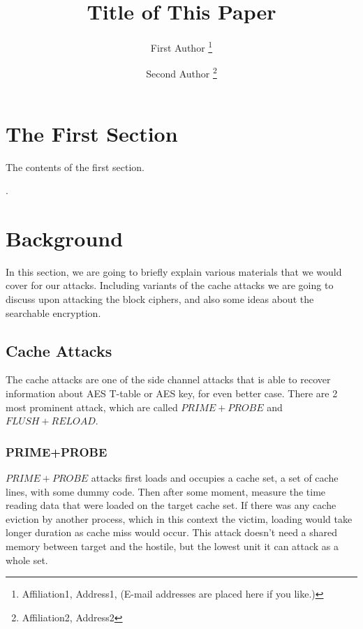 \documentclass[a4paper]{article}
\begin{document}
\title{
  Title of This Paper     %
}
\author{
  First Author           %
  \thanks{
    Affiliation1, Address1,   %
    (E-mail addresses are placed here if you like.)
  }
  \and
  Second Author          %
  \thanks{ %
    Affiliation2, Address2  %
  }
}

\maketitle

\section{The First Section}

The contents of the first section.

\newpage
.
\newpage
\section{Background}
In this section, we are going to briefly explain various materials that we would cover for our attacks. Including variants of the cache attacks we are going to discuss upon attacking the block ciphers, and also some ideas about the searchable encryption.

\subsection{Cache Attacks}

The cache attacks are one of the side channel attacks that is able to recover information about AES T-table or AES key, for even better case. There are 2 most prominent attack, which are called $PRIME+PROBE$ and $FLUSH+RELOAD$.

\subsubsection{PRIME+PROBE}

$PRIME+PROBE$ attacks first loads and occupies a cache set, a set of cache lines, with some dummy code. Then after some moment, measure the time reading data that were loaded on the target cache set. If there was any cache eviction by another process, which in this context the victim, loading would take longer duration as cache miss would occur. This attack doesn't need a shared memory between target and the hostile, but the lowest unit it can attack as a whole set.
\end{document}
